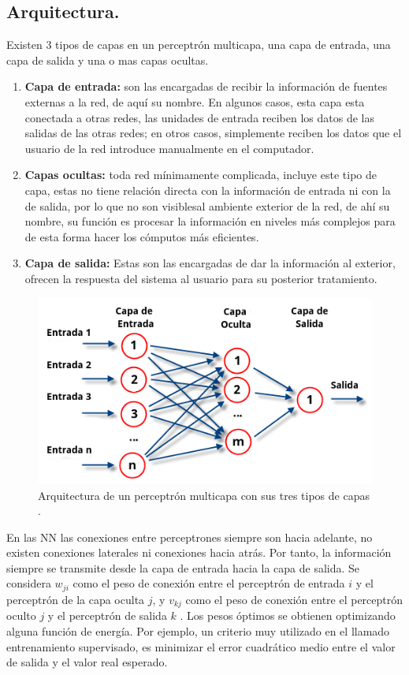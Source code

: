 \documentclass[12pt,letterpaper,oneside,openright]{book}
\begin{document}
 	\subsection{Arquitectura.}
 	Existen 3 tipos de capas en un perceptrón multicapa, una capa de entrada, una capa de salida y una o mas capas ocultas.
 	\begin{enumerate}
 		\item \textbf{Capa de entrada:} son las encargadas de recibir la información de fuentes externas a la red, de aquí su nombre. En algunos casos, esta capa esta conectada a otras redes, las unidades de entrada reciben los datos de las salidas de las otras redes; en otros casos, simplemente reciben los datos que el usuario de la red introduce manualmente en el computador.
 		\item \textbf{Capas ocultas:} toda red mínimamente complicada, incluye este tipo de capa, estas no tiene relación directa con la información de entrada ni con la de salida, por lo que no son \guillemetleft visibles\guillemetright al ambiente exterior de la red, de ahí su nombre, su función es procesar la información en niveles más complejos para de esta forma hacer los cómputos más eficientes.
 		\item \textbf{Capa de salida:} Estas son las encargadas de dar la información al exterior, ofrecen la respuesta del sistema al usuario para su posterior tratamiento.
 	\end{enumerate}
 	\begin{figure}[h]
 		\centering
 		\includegraphics[width=0.7\linewidth]{Sem_1/figuras/RedNeuronalArtificial.png}
 		\caption{Arquitectura de un perceptrón multicapa con sus tres tipos de capas \cite{percMulti}.}
 		\label{fig:perceptron_multicapa}
 	\end{figure}
 	
 	En las NN las conexiones entre perceptrones siempre son hacia adelante, no existen conexiones laterales ni conexiones hacia atrás. Por tanto, la información siempre se transmite desde la capa de entrada hacia la capa de salida. Se considera $w_{ji}$ como el peso de conexión entre el perceptrón de entrada $i$ y el perceptrón de la capa oculta $j$, y $v_{kj}$ como el peso de conexión entre el perceptrón oculto $j$ y el perceptrón de salida $k$ \cite{percepMulti}. Los pesos óptimos se obtienen optimizando alguna función de energía. Por ejemplo, un criterio muy utilizado en el llamado entrenamiento supervisado, es minimizar el error cuadrático medio entre el valor de salida y el valor real esperado.
 	
\end{document}
